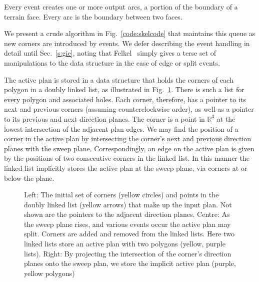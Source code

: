 Every event creates one or more output arcs, a portion of the boundary of a terrain face. Every arc is the boundary between two faces.

We present a crude algorithm in Fig.~\ref{code:skelcode} that maintains this queue as new corners are introduced by events. We defer describing the event handling in detail until Sec.~\ref{s:gie}, noting that Felkel~\cite{Felkel98} simply gives a terse set of manipulations to the data structure in the case of edge or split events.

The active plan is stored in a data structure that holds the corners of each polygon in a doubly linked list, as illustrated in Fig.~\ref{fig:skel_datas_structures}. There is such a list for every polygon and associated holes. Each corner, therefore, has a pointer to its next and previous corners (assuming counterclockwise order), as well as a pointer to its previous and next direction planes. The corner is a point in $\mathbb{R}^3$ at the lowest intersection of the adjacent plan edges. We may find the position of a corner in the active plan by intersecting the corner's next and previous direction planes with the sweep plane. Correspondingly, an edge on the active plan is given by the positions of two consecutive corners in the linked list. In this manner the linked list implicitly stores the active plan at the sweep plane, via corners at or below the plane. 
\begin{figure}
  \centering
  \def\svgwidth{1.0\columnwidth}
  
  \caption[The implicit active plan]{\label{fig:skel_datas_structures}Left: The initial set of corners (yellow circles) and points in the doubly linked list (yellow arrows) that make up the input plan. Not shown are the pointers to the adjacent direction planes. Centre: As the sweep plane rises, and various events occur the active plan may split. Corners are added and removed from the linked lists. Here two linked lists store an active plan with two polygons (yellow, purple lists). Right: By projecting the intersection of the corner's direction planes onto the sweep plan, we store the implicit active plan (purple, yellow polygons)  }
\end{figure}

